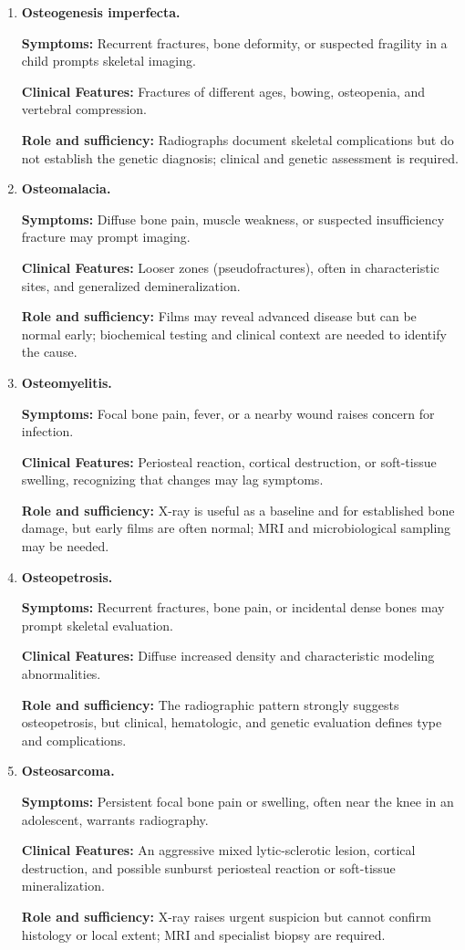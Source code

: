 \begin{enumerate}[leftmargin=*,itemsep=0.45em,topsep=0.4em]
\item \textbf{Osteogenesis imperfecta.}\par\noindent\textbf{Symptoms:} Recurrent fractures, bone deformity, or suspected fragility in a child prompts skeletal imaging.\par\noindent\textbf{Clinical Features:} Fractures of different ages, bowing, osteopenia, and vertebral compression.\par\noindent\textbf{Role and sufficiency:} Radiographs document skeletal complications but do not establish the genetic diagnosis; clinical and genetic assessment is required.
\item \textbf{Osteomalacia.}\par\noindent\textbf{Symptoms:} Diffuse bone pain, muscle weakness, or suspected insufficiency fracture may prompt imaging.\par\noindent\textbf{Clinical Features:} Looser zones (pseudofractures), often in characteristic sites, and generalized demineralization.\par\noindent\textbf{Role and sufficiency:} Films may reveal advanced disease but can be normal early; biochemical testing and clinical context are needed to identify the cause.
\item \textbf{Osteomyelitis.}\par\noindent\textbf{Symptoms:} Focal bone pain, fever, or a nearby wound raises concern for infection.\par\noindent\textbf{Clinical Features:} Periosteal reaction, cortical destruction, or soft-tissue swelling, recognizing that changes may lag symptoms.\par\noindent\textbf{Role and sufficiency:} X-ray is useful as a baseline and for established bone damage, but early films are often normal; MRI and microbiological sampling may be needed.
\item \textbf{Osteopetrosis.}\par\noindent\textbf{Symptoms:} Recurrent fractures, bone pain, or incidental dense bones may prompt skeletal evaluation.\par\noindent\textbf{Clinical Features:} Diffuse increased density and characteristic modeling abnormalities.\par\noindent\textbf{Role and sufficiency:} The radiographic pattern strongly suggests osteopetrosis, but clinical, hematologic, and genetic evaluation defines type and complications.
\item \textbf{Osteosarcoma.}\par\noindent\textbf{Symptoms:} Persistent focal bone pain or swelling, often near the knee in an adolescent, warrants radiography.\par\noindent\textbf{Clinical Features:} An aggressive mixed lytic-sclerotic lesion, cortical destruction, and possible sunburst periosteal reaction or soft-tissue mineralization.\par\noindent\textbf{Role and sufficiency:} X-ray raises urgent suspicion but cannot confirm histology or local extent; MRI and specialist biopsy are required.

\end{enumerate}
